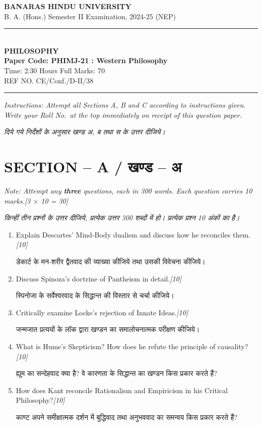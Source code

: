 \documentclass[11pt,a4paper]{article}
\newcommand{\pts}[1]{\hfill \textit{[#1]}}
\begin{document}
\begin{center}
  {\large\bfseries BANARAS HINDU UNIVERSITY}\\[2pt]
  {\normalsize B. A. (Hons.) Semester II Examination, 2024-25 (NEP)}\\[6pt]
  \rule{0.8\linewidth}{0.5pt}\\[6pt]
  {\large\bfseries PHILOSOPHY}\\[4pt]
  {\large\bfseries Paper Code: PHIMJ-21 : Western Philosophy}\\[4pt]
  {\normalsize Time: 2:30 Hours \hfill Full Marks: 70}\\[2pt]
  {\small REF NO. CE/Conf./D-II/38}
\end{center}
\rule{\linewidth}{0.4pt}
\smallskip

\noindent \textit{Instructions: Attempt all Sections A, B and C according to instructions given. Write your Roll No.\ at the top immediately on receipt of this question paper.}

\smallskip
\noindent \textit{दिये गये निर्देशों के अनुसार खण्ड अ, ब तथा स के उत्तर दीजिये।}

\bigskip

\section*{SECTION -- A / खण्ड -- अ}
\noindent \textit{Note: Attempt any \textbf{three} questions, each in 300 words. Each question carries 10 marks.}\pts{3 $\times$ 10 = 30}

\noindent \textit{किन्हीं तीन प्रश्नों के उत्तर दीजिये, प्रत्येक उत्तर 300 शब्दों में हो। प्रत्येक प्रश्न 10 अंकों का है।}

\begin{enumerate}[label=\textbf{\arabic*.},leftmargin=*,itemsep=12pt]

  \item Explain Descartes' Mind-Body dualism and discuss how he reconciles them.\pts{10}
  
  डेकार्ट के मन-शरीर द्वैतवाद की व्याख्या कीजिये तथा उसकी विवेचना कीजिये।

  \item Discuss Spinoza's doctrine of Pantheism in detail.\pts{10}
  
  स्पिनोजा के सर्वेश्वरवाद के सिद्धान्त की विस्तार से चर्चा कीजिये।

  \item Critically examine Locke's rejection of Innate Ideas.\pts{10}
  
  जन्मजात प्रत्ययों के लॉक द्वारा खण्डन का समालोचनात्मक परीक्षण कीजिये।

  \item What is Hume's Skepticism? How does he refute the principle of causality?\pts{10}
  
  ह्यूम का सन्देहवाद क्या है? वे कारणता के सिद्धान्त का खण्डन किस प्रकार करते हैं?

  \item How does Kant reconcile Rationalism and Empiricism in his Critical Philosophy?\pts{10}
  
  काण्ट अपने समीक्षात्मक दर्शन में बुद्धिवाद तथा अनुभववाद का समन्वय किस प्रकार करते हैं?

\end{enumerate}
\end{document}
